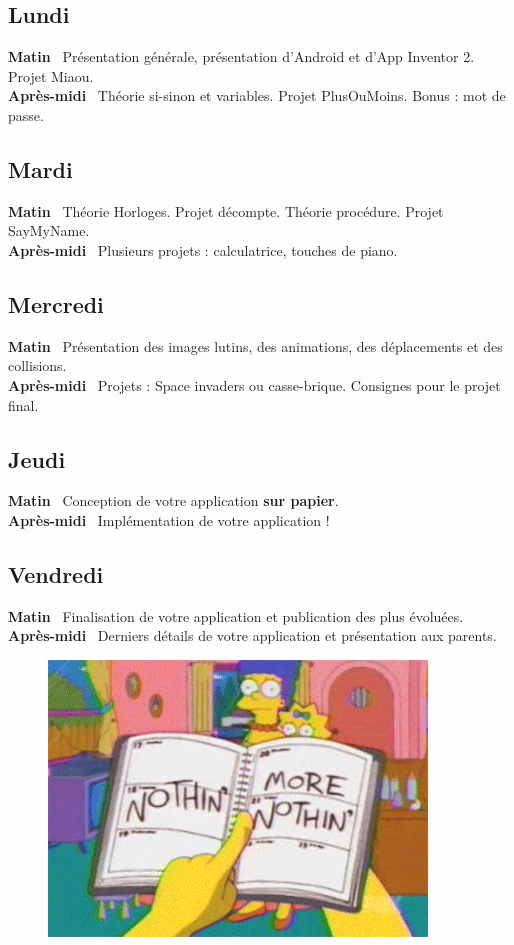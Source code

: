 \documentclass[12t,a4paper]{article}
\begin{document}
\subsection{Lundi}
\textbf{Matin}~ Présentation générale, présentation d'Android et d'App Inventor 2. Projet Miaou. \\
\textbf{Après-midi}~ Théorie si-sinon et variables. Projet PlusOuMoins. Bonus : mot de passe.

\subsection{Mardi}
\textbf{Matin}~ Théorie Horloges. Projet décompte. Théorie procédure. Projet SayMyName. \\
\textbf{Après-midi}~ Plusieurs projets : calculatrice, touches de piano.

\subsection{Mercredi}
\textbf{Matin}~ Présentation des images lutins, des animations, des déplacements et des collisions. \\
\textbf{Après-midi}~ Projets : Space invaders ou casse-brique. Consignes pour le projet final.

\subsection{Jeudi}
\textbf{Matin}~ Conception de votre application \textbf{sur papier}. \\
\textbf{Après-midi}~ Implémentation de votre application !

\subsection{Vendredi}
\textbf{Matin}~ Finalisation de votre application et publication des plus évoluées. \\
\textbf{Après-midi}~ Derniers détails de votre application et présentation aux parents.

\vfill

\begin{figure}[h!]
\begin{center}
\includegraphics[scale=0.5]{schedule.png}
\end{center}
\end{figure}
\end{document}
